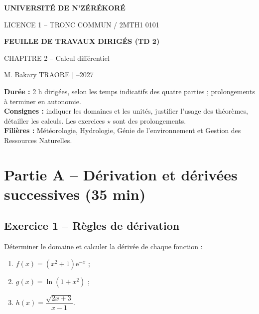 \documentclass[11pt,a4paper,oneside]{article}
\newcommand{\e}{\mathrm e}
\begin{document}
\begin{tcolorbox}[enhanced,colback=Bleu,colframe=Bleu,boxrule=0pt,sharp corners,left=5mm,right=5mm,top=5mm,bottom=5mm]
\begin{center}
{\color{white}\large\bfseries UNIVERSITÉ DE N'ZÉRÉKORÉ\par}\vspace{.14cm}
{\color{white!85}\normalsize LICENCE 1 -- TRONC COMMUN \quad / \quad 2MTH1 0101\par}\vspace{.30cm}
{\color{white}\LARGE\bfseries FEUILLE DE TRAVAUX DIRIGÉS (TD 2)\par}\vspace{.14cm}
{\color{white!95}\large CHAPITRE 2 -- Calcul différentiel\par}\vspace{.14cm}
{\color{white!80}\small M. Bakary TRAORE \quad | --2027\par}
\end{center}
\end{tcolorbox}
\begin{objectifbox}
\textbf{Durée :} 2 h dirigées, selon les temps indicatifs des quatre parties ; prolongements à terminer en autonomie.\\
\textbf{Consignes :} indiquer les domaines et les unités, justifier l'usage des théorèmes, détailler les calculs. Les exercices $\star$ sont des prolongements.\\
\textbf{Filières :} Météorologie, Hydrologie, Génie de l'environnement et Gestion des Ressources Naturelles.
\end{objectifbox}

\section*{Partie A -- Dérivation et dérivées successives (35 min)}
\subsection*{Exercice 1 -- Règles de dérivation}
Déterminer le domaine et calculer la dérivée de chaque fonction :
\begin{enumerate}[label=\alph*)]
\item $f(x)=(x^2+1)\e^{-x}$ ;
\item $g(x)=\ln(1+x^2)$ ;
\item $h(x)=\dfrac{\sqrt{2x+3}}{x-1}$.
\end{enumerate}
\end{document}
